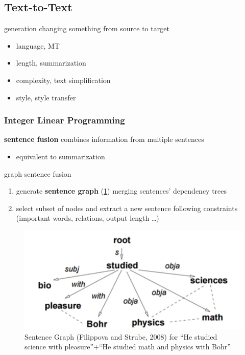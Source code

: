 \documentclass[]{article}
\theoremstyle{definition}
\begin{document}
\subsection{Text-to-Text}%
\label{sub:text_to_text}

generation changing something from source to target
\begin{itemize}
    \item language, MT
    \item length, summarization
    \item complexity, text simplification
    \item style, style transfer
\end{itemize}

\subsubsection{Integer Linear Programming}%
\label{ssub:integer_linear_programming}

\textbf{sentence fusion} combines information from multiple sentences
\begin{itemize}
    \item equivalent to summarization
\end{itemize}

graph sentence fusion
\begin{enumerate}
    \item generate \textbf{sentence graph} (\ref{fig:sentence-graph}) merging sentences' dependency trees
    \item select subset of nodes and extract a new sentence following constraints (important words, relations, output length \ldots)
\end{enumerate}

\begin{figure}[ht]
    \centering
    \includegraphics[width=0.6\linewidth]{comp550/sentence-graph.png}
    \caption{Sentence Graph (Filippova and Strube, 2008) for ``He studied science with pleasure''+``He studied math and physics with Bohr''}
    \label{fig:sentence-graph}
\end{figure}
\end{document}
